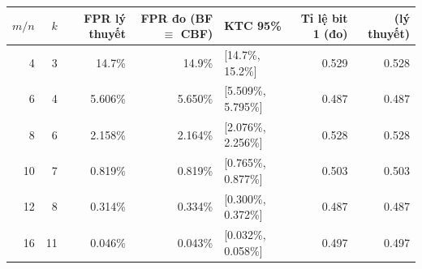\begin{tabular}{@{}rrrrlrr@{}}
\toprule
$m/n$ & $k$ & FPR lý thuyết & FPR đo (BF $\equiv$ CBF) & KTC 95\% & Tỉ lệ bit 1 (đo) & (lý thuyết)\\
\midrule
4 & 3 & 14.7\% & 14.9\% & [14.7\%, 15.2\%] & 0.529 & 0.528\\
6 & 4 & 5.606\% & 5.650\% & [5.509\%, 5.795\%] & 0.487 & 0.487\\
8 & 6 & 2.158\% & 2.164\% & [2.076\%, 2.256\%] & 0.528 & 0.528\\
10 & 7 & 0.819\% & 0.819\% & [0.765\%, 0.877\%] & 0.503 & 0.503\\
12 & 8 & 0.314\% & 0.334\% & [0.300\%, 0.372\%] & 0.487 & 0.487\\
16 & 11 & 0.046\% & 0.043\% & [0.032\%, 0.058\%] & 0.497 & 0.497\\
\bottomrule
\end{tabular}

